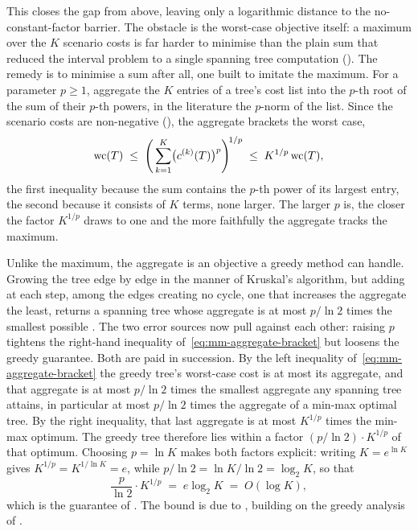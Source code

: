 This closes the gap from above, leaving only a logarithmic distance to the no-constant-factor barrier.
The obstacle is the worst-case objective itself: a maximum over the $K$ scenario costs is far harder to minimise than the plain sum that reduced the interval problem to a single spanning tree computation ().
The remedy is to minimise a sum after all, one built to imitate the maximum.
For a parameter $p \geq 1$, aggregate the $K$ entries of a tree's cost list into the $p$-th root of the sum of their $p$-th powers, in the literature the $p$-norm of the list.
Since the scenario costs are non-negative (), the aggregate brackets the worst case,
\begin{equation}\label{eq:mm-aggregate-bracket}
\mathrm{wc}(T)
\;\leq\;
\Biggl(\, \sum_{k=1}^{K} \bigl(c^{(k)}(T)\bigr)^{p} \Biggr)^{\!1/p}
\;\leq\;
K^{1/p}\, \mathrm{wc}(T),
\end{equation}
the first inequality because the sum contains the $p$-th power of its largest entry, the second because it consists of $K$ terms, none larger.
The larger $p$ is, the closer the factor $K^{1/p}$ draws to one and the more faithfully the aggregate tracks the maximum.

Unlike the maximum, the aggregate is an objective a greedy method can handle.
Growing the tree edge by edge in the manner of Kruskal's algorithm, but adding at each step, among the edges creating no cycle, one that increases the aggregate the least, returns a spanning tree whose aggregate is at most $p / \ln 2$ times the smallest possible \cite[Theorem~5.21]{Goerigk2021RCO}.
The two error sources now pull against each other: raising $p$ tightens the right-hand inequality of~\eqref{eq:mm-aggregate-bracket} but loosens the greedy guarantee.
Both are paid in succession.
By the left inequality of~\eqref{eq:mm-aggregate-bracket} the greedy tree's worst-case cost is at most its aggregate, and that aggregate is at most $p / \ln 2$ times the smallest aggregate any spanning tree attains, in particular at most $p / \ln 2$ times the aggregate of a min-max optimal tree.
By the right inequality, that last aggregate is at most $K^{1/p}$ times the min-max optimum.
The greedy tree therefore lies within a factor $(p / \ln 2) \cdot K^{1/p}$ of that optimum.
Choosing $p = \ln K$ makes both factors explicit: writing $K = e^{\ln K}$ gives $K^{1/p} = K^{1 / \ln K} = e$, while $p / \ln 2 = \ln K / \ln 2 = \log_2 K$, so that
\[
\frac{p}{\ln 2} \cdot K^{1/p}
\;=\;
e \log_2 K
\;=\;
O(\log K),
\]
which is the guarantee of  \cite[Corollary~5.22]{Goerigk2021RCO}.
The bound is due to \textcite{Baak2025}, building on the greedy analysis of \textcite{Bilo2017}.

